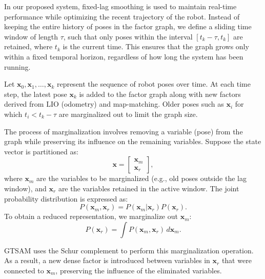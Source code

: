 In our proposed system, fixed-lag smoothing is used to maintain real-time performance while optimizing the recent trajectory of the robot. Instead of keeping the entire history of poses in the factor graph, we define a sliding time window of length \( \tau \), such that only poses within the interval \( [t_k - \tau, t_k] \) are retained, where \( t_k \) is the current time. This ensures that the graph grows only within a fixed temporal horizon, regardless of how long the system has been running.

Let \( \mathbf{x}_0, \mathbf{x}_1, \dots, \mathbf{x}_k \) represent the sequence of robot poses over time. At each time step, the latest pose \( \mathbf{x}_k \) is added to the factor graph along with new factors derived from LIO (odometry) and map-matching. Older poses such as \( \mathbf{x}_i \) for which \( t_i < t_k - \tau \) are marginalized out to limit the graph size.

The process of marginalization involves removing a variable (pose) from the graph while preserving its influence on the remaining variables. Suppose the state vector is partitioned as:
\begin{equation}
	\mathbf{x} = \begin{bmatrix} \mathbf{x}_m \\ \mathbf{x}_r \end{bmatrix},
\end{equation}
where \( \mathbf{x}_m \) are the variables to be marginalized (e.g., old poses outside the lag window), and \( \mathbf{x}_r \) are the variables retained in the active window. The joint probability distribution is expressed as:
\begin{equation}
	P(\mathbf{x}_m, \mathbf{x}_r) = P(\mathbf{x}_m | \mathbf{x}_r) P(\mathbf{x}_r).
\end{equation}
To obtain a reduced representation, we marginalize out \( \mathbf{x}_m \):
\begin{equation}
	P(\mathbf{x}_r) = \int P(\mathbf{x}_m, \mathbf{x}_r) \, d\mathbf{x}_m.
\end{equation}

GTSAM uses the Schur complement to perform this marginalization operation. As a result, a new dense factor is introduced between variables in \( \mathbf{x}_r \) that were connected to \( \mathbf{x}_m \), preserving the influence of the eliminated variables.

